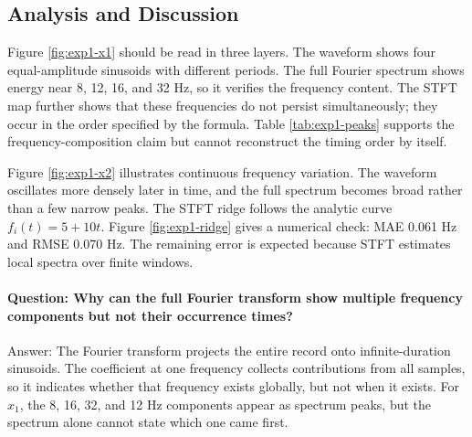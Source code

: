 \documentclass[a4paper,11pt]{article}
\numberwithin{equation}{section}
\begin{document}
\begin{table}[H]
\centering
\caption{Main full-record Fourier peaks and chirp ridge error summary for Experiment 1.}
\label{tab:exp1-peaks}
\scriptsize
{}
\end{table}


\subsection{Analysis and Discussion}
Figure \ref{fig:exp1-x1} should be read in three layers. The waveform shows four equal-amplitude sinusoids with different periods. The full Fourier spectrum shows energy near 8, 12, 16, and 32 Hz, so it verifies the frequency content. The STFT map further shows that these frequencies do not persist simultaneously; they occur in the order specified by the formula. Table \ref{tab:exp1-peaks} supports the frequency-composition claim but cannot reconstruct the timing order by itself.

Figure \ref{fig:exp1-x2} illustrates continuous frequency variation. The waveform oscillates more densely later in time, and the full spectrum becomes broad rather than a few narrow peaks. The STFT ridge follows the analytic curve $f_i(t)=5+10t$. Figure \ref{fig:exp1-ridge} gives a numerical check: MAE 0.061 Hz and RMSE 0.070 Hz. The remaining error is expected because STFT estimates local spectra over finite windows.

\paragraph{Question: Why can the full Fourier transform show multiple frequency components but not their occurrence times?}
Answer: The Fourier transform projects the entire record onto infinite-duration sinusoids. The coefficient at one frequency collects contributions from all samples, so it indicates whether that frequency exists globally, but not when it exists. For $x_1$, the 8, 16, 32, and 12 Hz components appear as spectrum peaks, but the spectrum alone cannot state which one came first.
\end{document}
